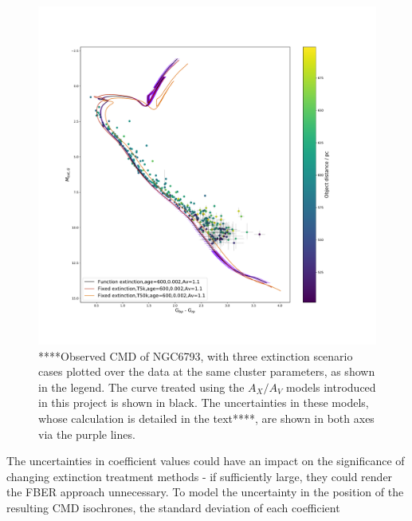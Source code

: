 \documentclass[12pt, a4paper]{report}
\begin{document}
\begin{figure}[h!]
\begin{center}
\includegraphics[width=1.0\textwidth]{../NGC_6793_CMD_Myr_model_err_plx_selected_vizier.pdf}
\caption{****Observed CMD of NGC6793, with three extinction scenario cases plotted over the data at the same cluster parameters, as shown in the legend. The curve treated using the $A_{X}/A_{V}$ models introduced in this project is shown in black. The uncertainties in these models, whose calculation is detailed in the text****, are shown in both axes via the purple lines.}
\label{AxAv_model_err}
\end{center}
\end{figure}

The uncertainties in coefficient values could have an impact on the significance of changing extinction treatment methods - if sufficiently large, they could render the FBER approach unnecessary. To model the uncertainty in the position of the resulting CMD isochrones, the standard deviation of each coefficient
\end{document}
